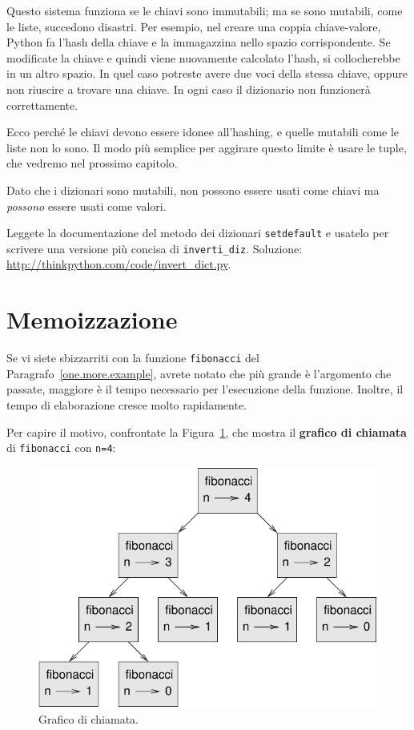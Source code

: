 \documentclass[10pt]{book}
\begin{document}
Questo sistema funziona se le chiavi sono immutabili; ma se sono mutabili, come le liste, succedono disastri. Per esempio, nel creare una coppia chiave-valore, Python fa l'hash della chiave e la immagazzina nello spazio corrispondente. Se modificate la chiave e quindi viene nuovamente calcolato l'hash, si collocherebbe in un altro spazio. In quel caso potreste avere due voci della stessa chiave, oppure non riuscire a trovare una chiave. In ogni caso il dizionario non funzionerà correttamente.

Ecco perché le chiavi devono essere idonee all'hashing, e quelle mutabili come le liste non lo sono. Il modo più semplice per aggirare questo limite è usare le tuple, che vedremo nel prossimo capitolo.

Dato che i dizionari sono mutabili, non possono essere usati come chiavi ma {\em possono} essere usati come valori.

\vspace{0.2in}
\begin{exercise}
Leggete la documentazione del metodo dei dizionari {\tt setdefault}
e usatelo per scrivere una versione più concisa di \verb"inverti_diz".
Soluzione: \url{http://thinkpython.com/code/invert_dict.py}.

\end{exercise}


\section{Memoizzazione}

Se vi siete sbizzarriti con la funzione {\tt fibonacci} del Paragrafo~\ref{one.more.example}, avrete notato che più grande è l'argomento che passate, maggiore è il tempo necessario per l'esecuzione della funzione. Inoltre, il tempo di elaborazione cresce molto rapidamente.

Per capire il motivo, confrontate la Figura~\ref{fig.fibonacci}, che mostra il {\bf grafico di chiamata} di {\tt fibonacci} con {\tt n=4}:

\begin{figure}
\centerline
{\includegraphics[scale=0.7]{figs/fibonacci.pdf}}
\caption{Grafico di chiamata.}
\label{fig.fibonacci}
\end{figure}
\end{document}
